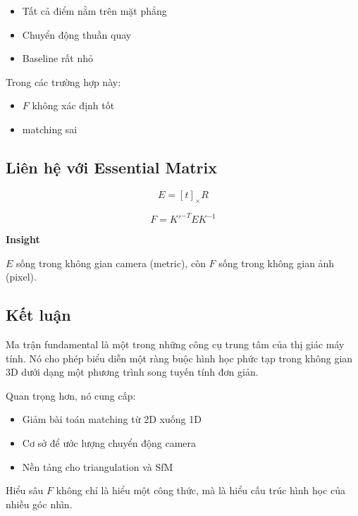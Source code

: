 \begin{itemize}
	\item Tất cả điểm nằm trên mặt phẳng
	\item Chuyển động thuần quay
	\item Baseline rất nhỏ
\end{itemize}

Trong các trường hợp này:
\begin{itemize}
	\item $F$ không xác định tốt
	\item matching sai
\end{itemize}

\subsection{Liên hệ với Essential Matrix}
\label{subsec:essential_relation}

\[
E = [t]_\times R
\]

\[
F = K'^{-T} E K^{-1}
\]

\begin{mdframed}[style=infobox]
	\textbf{Insight}
	
	$E$ sống trong không gian camera (metric), còn $F$ sống trong không gian ảnh (pixel).
\end{mdframed}

\subsection*{Kết luận}
\label{subsec:F_conclusion}

Ma trận fundamental là một trong những công cụ trung tâm của thị giác máy tính. Nó cho phép biểu diễn một ràng buộc hình học phức tạp trong không gian 3D dưới dạng một phương trình song tuyến tính đơn giản.

Quan trọng hơn, nó cung cấp:

\begin{itemize}
	\item Giảm bài toán matching từ 2D xuống 1D
	\item Cơ sở để ước lượng chuyển động camera
	\item Nền tảng cho triangulation và SfM
\end{itemize}

Hiểu sâu $F$ không chỉ là hiểu một công thức, mà là hiểu cấu trúc hình học của nhiều góc nhìn.
